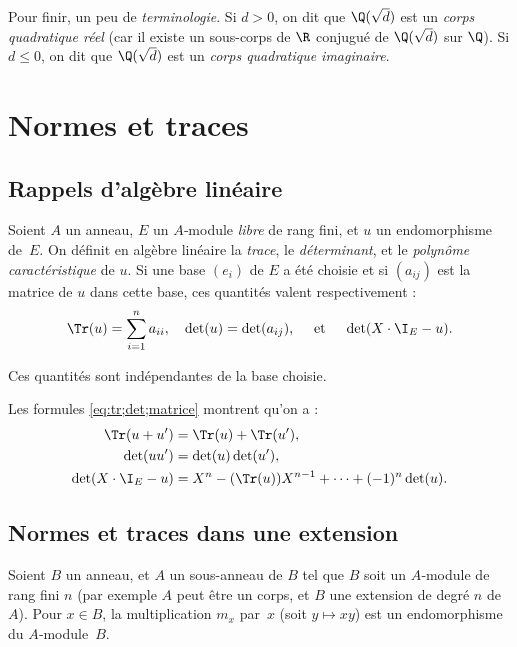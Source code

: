 \documentclass[11pt, useosf,
  title in boldface,
  theorem in new line,
  theorem numbering = section,
  number theorems separately,
]{simplivre}
\begin{document}
    Pour finir, un peu de \emph{terminologie}. Si \( d > 0 \), on dit que \( \Q(\sqrt{d}) \) est un \emph{corps quadratique réel} (car il existe un sous-corps de \( \R \) conjugué de \( \Q(\sqrt{d}) \) sur \( \Q \)). Si \( d \leqslant 0 \), on dit que \( \Q(\sqrt{d}) \) est un \emph{corps quadratique imaginaire}.

\section{Normes et traces}\label{sec:normes et traces}

\subsection{Rappels d'algèbre linéaire}
    Soient \( A \) un anneau, \( E \) un \( A \)‑module \emph{libre} de rang fini, et \( u \) un endomorphisme de~\( E \). On définit en algèbre linéaire la \emph{trace}, le \emph{déterminant}, et le \emph{polynôme caractéristique} de \( u \). Si une base \( (e_i) \) de \( E \) a été choisie et si \( (a_{ij}) \) est la matrice de \( u \) dans cette base, ces quantités valent respectivement :
    \begin{equation}\label{eq:tr;det;matrice}
        \Tr(u) = \sum_{i=1}^n a_{ii}, \quad
        \det(u) = \det(a_{ij}), \quad \text{ et } \quad
        \det(X\cdot \I_E - u).
    \end{equation}
    \begin{remark}
        Ces quantités sont indépendantes de la base choisie.
    \end{remark}

    Les formules \eqref{eq:tr;det;matrice} montrent qu'on a :
    \begin{align}\label{eq:tr;det;prop}
        \Tr(u+u') &= \Tr(u)+\Tr(u'),\nonumber\\
        \det(uu') &= \det(u)\det(u'),\\
        \det(X\cdot \I_E - u) &= X^n - (\Tr(u))X^{n-1} + \cdots + (-1)^n \det(u).\nonumber
    \end{align}

\subsection{Normes et traces dans une extension}
    Soient \( B \) un anneau, et \( A \) un sous-anneau de \( B \) tel que \( B \) soit un \( A \)‑module de rang fini \( n \) (par exemple \( A \) peut être un corps, et \( B \) une extension de degré \( n \) de~\( A \)). Pour \( x \in B \), la multiplication \( m_x \) par~\( x \) (soit \( y \mapsto xy \)) est un endomorphisme du \( A \)‑module~\( B \).
\end{document}
